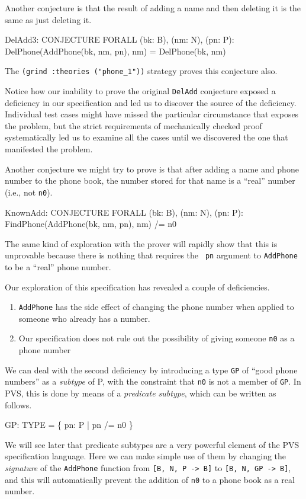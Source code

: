 Another conjecture is that the result of adding a name and then
deleting it is the same as just deleting it.
\begin{jmrsession}
  DelAdd3: CONJECTURE  FORALL (bk: B), (nm: N), (pn: P):
    DelPhone(AddPhone(bk, nm, pn), nm) = DelPhone(bk, nm)
\end{jmrsession}
The {\tt (grind :theories ("phone\_1"))} strategy proves this
conjecture also.

Notice how our inability to prove the original {\tt DelAdd} conjecture
exposed a deficiency in our specification and led us to discover the
source of the deficiency.  Individual test cases might have missed the
particular circumstance that exposes the problem, but the strict
requirements of mechanically checked proof systematically led us to
examine all the cases until we discovered the one that manifested the
problem.

Another conjecture we might try to prove is that after adding a name
and phone number to the phone book, the number stored for that name is
a ``real'' number (i.e., not {\tt n0}).
\begin{jmrsession}
  KnownAdd: CONJECTURE  FORALL (bk: B), (nm: N), (pn: P):
    FindPhone(AddPhone(bk, nm, pn), nm) /= n0
\end{jmrsession}
The same kind of exploration with the prover will rapidly show that
this is unprovable because there is nothing that requires the {\tt
pn} argument to {\tt AddPhone} to be a ``real'' phone number.

Our exploration of this specification has revealed a couple of
deficiencies.
\begin{enumerate}
\item {\tt AddPhone} has the side effect of changing the phone number
when applied to someone who already has a number.

\item Our specification does not rule out the possibility
      of giving someone {\tt n0} as a phone number
\end{enumerate}

We can deal with the second deficiency by introducing a type {\tt GP}
of ``good phone numbers'' as a {\em subtype\/} of P, with the
constraint that {\tt n0} is not a member of {\tt GP}.  In PVS, this is
done by means of a {\em predicate subtype}, which can be written as
follows.
\begin{jmrsession}
  GP: TYPE = \{ pn: P | pn /= n0 \}
\end{jmrsession}
We will see later that predicate subtypes are a very powerful element
of the PVS specification language.  Here we can make simple use of
them by changing the {\em signature\/} of the {\tt AddPhone}
function from {\tt [B, N, P -> B]} to {\tt [B, N, GP -> B]}, and this
will automatically prevent the addition of {\tt n0} to a phone book as
a real number.

